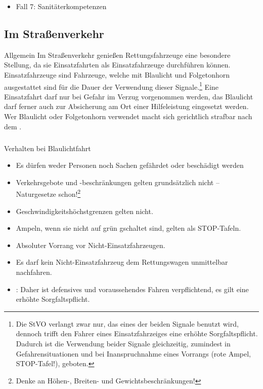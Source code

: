 {
\begin{itemize}
  \item Fall 7: Sanitäterkompetenzen
  \dotfill{}
\end{itemize}
}
{}
{}
{}
{}




\subsection{Im Straßenverkehr}

\Text
{Allgemein}%
{%
\label{topic:einsatzfahrt}%
\label{topic:einsatzfahrtt-missbrauch}%
Im Straßenverkehr genießen Rettungsfahrzeuge eine besondere
Stellung, da sie Einsatzfahrten als Einsatzfahrzeuge
durchführen können.
Einsatzfahrzeuge sind Fahrzeuge, welche mit Blaulicht und
Folgetonhorn ausgestattet sind für die Dauer der Verwendung
dieser Signale.\footnote{Die StVO verlangt zwar nur, das
eines der beiden Signale benutzt wird, dennoch trifft den
Fahrer eines Einsatzfahrzeiges eine erhöhte
Sorgfaltspflicht. Dadurch ist die Verwendung beider Signale
gleichzeitig, zumindest in Gefahrensituationen und bei
Inanspruchnahme eines Vorrangs (rote Ampel, STOP-Tafel!),
geboten.} Eine Einsatzfahrt
darf nur bei Gefahr im Verzug vorgenommen werden, das
Blaulicht darf ferner auch zur Absicherung am
Ort einer Hilfeleistung eingesetzt
werden. 
Wer Blaulicht oder Folgetonhorn 
verwendet macht sich gerichtlich strafbar nach dem
. 
}%


\subparagraph{}
\Text
{Verhalten bei Blaulichtfahrt}%
{%
\begin{itemize}
    \item Es dürfen weder Personen noch Sachen gefährdet oder beschädigt
    werden
    \item Verkehrsgebote und -beschränkungen gelten
    grundsätzlich nicht -- Naturgesetze
    schon!\footnote{Denke an Höhen-, Breiten- und Gewichtsbeschränkungen!}
    \item Geschwindigkeitshöchstgrenzen gelten nicht.
    \item Ampeln, wenn sie nicht auf grün gschaltet sind,
    gelten als STOP-Tafeln.
    \item Absoluter Vorrang vor Nicht-Einsatzfahrzeugen.
    \item Es darf kein Nicht-Einsatzfahrzeug dem Rettungswagen unmittelbar
    nachfahren.
    \item {}:  Daher ist
    defensives und voraussehendes Fahren verpflichtend, es
    gilt eine erhöhte Sorgfaltspflicht.
\end{itemize}
}%



